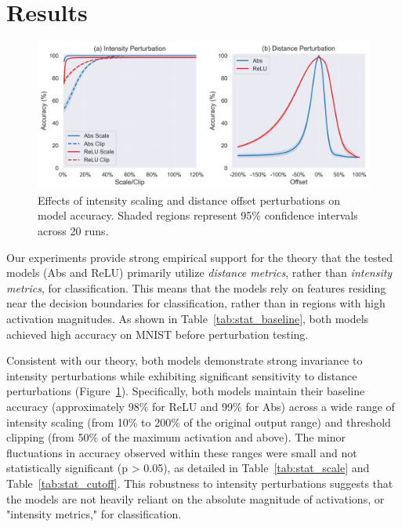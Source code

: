 \section{Results}

\begin{figure}[h]
  \centering
  \includegraphics[width=\textwidth]{images/perturbation_analysis}
  \caption{Effects of intensity scaling and distance offset perturbations on model accuracy. Shaded regions represent 95\% confidence intervals across 20 runs.}
  \label{fig:perturbation_analysis}
\end{figure}

Our experiments provide strong empirical support for the theory that the tested models (Abs and ReLU) primarily utilize \textit{distance metrics}, rather than \textit{intensity metrics}, for classification. This means that the models rely on features residing near the decision boundaries for classification, rather than in regions with high activation magnitudes. As shown in Table~\ref{tab:stat_baseline}, both models achieved high accuracy on MNIST before perturbation testing. 

Consistent with our theory, both models demonstrate strong invariance to intensity perturbations while exhibiting significant sensitivity to distance perturbations (Figure~\ref{fig:perturbation_analysis}). Specifically, both models maintain their baseline accuracy (approximately 98\% for ReLU and 99\% for Abs) across a wide range of intensity scaling (from 10\% to 200\% of the original output range) and threshold clipping (from 50\% of the maximum activation and above). The minor fluctuations in accuracy observed within these ranges were small and not statistically significant (p > 0.05), as detailed in Table~\ref{tab:stat_scale} and Table~\ref{tab:stat_cutoff}. This robustness to intensity perturbations suggests that the models are not heavily reliant on the absolute magnitude of activations, or "intensity metrics," for classification.

